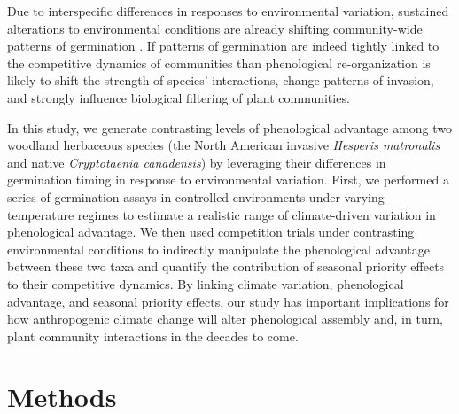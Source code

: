 \documentclass{article}[11pt]
\begin{document}
Due  to interspecific differences in responses to environmental variation, sustained alterations to environmental conditions are already shifting community-wide patterns of germination \citep{Walck2011}. If patterns of germination are indeed tightly linked to the competitive dynamics of communities than phenological re-organization is likely to shift the strength of species' interactions, change patterns of invasion, and strongly influence biological filtering of plant communities. 

In this study, we generate contrasting levels of phenological advantage among two woodland herbaceous species (the North American invasive \textit{Hesperis matronalis} and native \textit{Cryptotaenia canadensis}) by leveraging their differences in germination timing in response to environmental variation. First, we performed a series of germination assays in controlled environments under varying temperature regimes to estimate a realistic range of climate-driven variation in phenological advantage. %
We then used competition trials under contrasting environmental conditions to indirectly manipulate the phenological advantage between these two taxa and quantify the contribution of seasonal priority effects to their competitive dynamics. By linking climate variation, phenological advantage, and seasonal priority effects, our study has important implications for how anthropogenic climate change will alter phenological assembly and, in turn, plant community interactions in the decades to come.

\section*{Methods}
\end{document}
